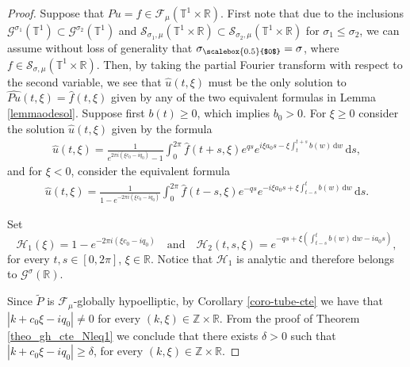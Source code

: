 \documentclass[11pt,reqno]{amsart}
\numberwithin{equation}{section}
\theoremstyle{definition}
\theoremstyle{definition}
\newcommand{\T}{\mathbb{T}}
\newcommand{\G}{\mathnormal{\mathbb{T}^{m}\times\mathbb{R}^n}}
\newcommand{\R}{\mathbb{R}}
\newcommand{\Z}{\mathbb{Z}}
\newcommand{\s}{\mathcal{S}(\G)}
\newcommand{\g}{\mathbb{T}^1\times\mathbb{R}}
\renewcommand{\s}{\mathcal{S}_{\sigma,\mu}(\T^1\times\R)}
\newcommand{\Smu}{\mathscr{F}_{\mu}(\T^1\times\R)}
\newcommand{\sigmac}{\sigma_{\scalebox{0.5}{$0$}}}
\begin{document}
\begin{proof}
    Suppose that $Pu=f\in\Smu$. First note that due to the inclusions $\mathscr{G}^{\sigma_1}(\T^1)\subset \mathscr{G}^{\sigma_2}(\T^1)$ and $\mathcal{S}_{\sigma_1,\mu}(\g)\subset\mathcal{S}_{\sigma_2,\mu}(\g)$ for $\sigma_1\leq \sigma_2$, we can assume without loss of generality that $\sigmac=\sigma$, where  $f\in\s$. Then, by taking the partial Fourier transform with respect to the second variable, we see that $\widehat{u}(t,\xi)$ must be the only solution to $\widehat{Pu}(t,\xi) = \widehat{f}(t,\xi)$ given by any of the two equivalent formulas in Lemma \ref{lemmaodesol}. Suppose first $b(t)\geq 0$, which implies $ b_0>0$. For $\xi\geq 0$ consider the solution $\widehat{u}(t,\xi)$ given by the formula
    \begin{align*}
        \widehat{u}(t,\xi)=\frac{1}{e^{2\pi i(\xi c_0-iq_0)}-1}\int_{0}^{2\pi}\widehat{f}(t+s,\xi)e^{qs}e^{i\xi a_0s-\xi\int_{t}^{t+s}b(w)\,\mathrm{d}w}\,\mathrm{d}s,
    \end{align*}
    and for $\xi<0$, consider the equivalent formula
        \begin{align*}
        \widehat{u}(t,\xi)=\frac{1}{1-e^{-2\pi i(\xi c_0-iq_0)}}\int_{0}^{2\pi}\widehat{f}(t-s,\xi)e^{-qs}e^{-i\xi a_0s+\xi\int_{t-s}^{t}b(w)\,\mathrm{d}w}\,\mathrm{d}s.
    \end{align*}

    Set 
    \begin{equation*}
        \mathcal{H}_1(\xi)=1-e^{-2\pi i (\xi c_0-i q_0)}\quad\text{and}\quad 
         \mathcal{H}_2(t,s,\xi)=e^{-qs+\xi\left(\int_{t-s}^t b(w)\,\mathrm{d}w-ia_0s\right)},
    \end{equation*}
    for every $t,s\in [0,2\pi]$, $\xi\in\R$.
    Notice that $\mathcal{H}_1$ is analytic and therefore belongs to $\mathscr{G}^\sigma(\R)$.

    Since $\tilde P$ is $\mathscr{F}_{\mu}$-globally hypoelliptic, by Corollary \ref{coro-tube-cte} we have that $|k+c_0\xi-iq_0|\neq 0$ for every $(k,\xi)\in\Z\times \R$. From the proof of Theorem \ref{theo_gh_cte_Nleq1} we conclude that there exists $\delta>0$ such that 
    $|k+c_0\xi-iq_0|\geq \delta$, for every $(k,\xi)\in\Z\times \R$.


\end{proof}
\end{document}
